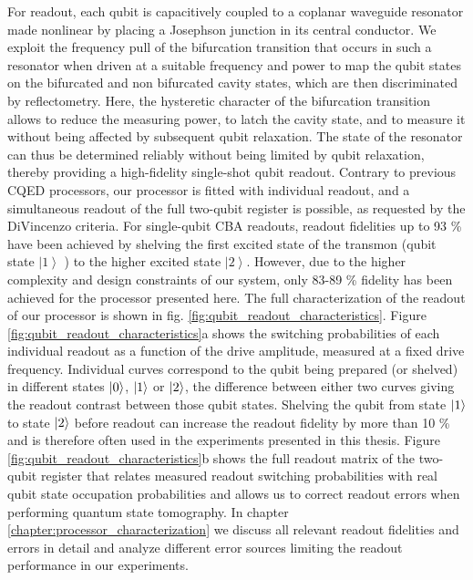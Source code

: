 For readout, each qubit is capacitively coupled to
a coplanar waveguide resonator made nonlinear by placing a Josephson
junction in its central conductor. We exploit the frequency pull of
the bifurcation transition that occurs in such a resonator when driven
at a suitable frequency and power to map the qubit
states on the bifurcated and non bifurcated cavity states, which are
then discriminated by reflectometry. Here, the hysteretic
character of the bifurcation transition allows to reduce the measuring
power, to latch the cavity state, and to measure it without being
affected by subsequent qubit relaxation. The state of the resonator
can thus be determined reliably without being limited by qubit relaxation,
thereby providing a high-fidelity single-shot qubit readout. Contrary
to previous CQED processors, our processor is fitted with individual
readout, and a simultaneous readout of the full two-qubit register
is possible, as requested by the DiVincenzo criteria. For single-qubit
CBA readouts, readout fidelities up to 93 \% have been achieved
\citep{mallet_single-shot_2009} by shelving the first excited state
of the transmon (qubit state $\left|1\right\rangle $ ) to the higher
excited state $\left|2\right\rangle $. However, due to the higher
complexity and design constraints of our system, only 83-89 \% fidelity
has been achieved for the processor presented here. The full characterization
of the readout of our processor is shown in fig.
\ref{fig:qubit_readout_characteristics}. Figure \ref{fig:qubit_readout_characteristics}a
shows the switching probabilities of each individual
readout as a function of the drive amplitude, measured at a fixed
drive frequency. Individual curves correspond to the qubit being prepared
(or shelved) in different states $\left| 0 \right>$, $\left| 1 \right>$
or $\left| 2 \right>$, the difference between either two curves giving the
readout contrast between those qubit states. Shelving
the qubit from state $\left| 1 \right>$ to state $\left| 2 \right>$ before readout
can increase the readout fidelity by more than 10 \% and is therefore
often used in the experiments presented in this thesis. Figure
\ref{fig:qubit_readout_characteristics}b shows the full readout matrix
of the two-qubit register that relates measured readout switching
probabilities with real qubit state occupation probabilities and allows
us to correct readout errors when performing quantum state tomography.
In chapter \ref{chapter:processor_characterization} we discuss all relevant readout fidelities
and errors in detail and analyze different error sources limiting
the readout performance in our experiments.



